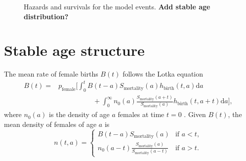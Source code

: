 \documentclass[12pt]{article}
\newcommand{\md}{\mathrm{d}}
\begin{document}
\begin{figure}
  \centering
  
  \caption{Hazards and survivals for the model events.
    \textbf{Add stable age distribution?}}
  \label{fig:distributions}
\end{figure}


\section{Stable age structure}
\label{stable_age_structure}

The mean rate of female births $B(t)$ follows the Lotka equation
\begin{equation}
  \label{lotka}
  \begin{split}
    B(t) =&
    p_{\text{female}} \bigg[
      \int_0^t B(t - a)
      S_{\text{mortality}}(a)
      h_{\text{birth}}(t, a) \md a
    \\
    & \quad\quad\quad\quad\quad {} +
      \int_0^{\infty} n_0(a)
      \frac{S_{\text{mortality}}(a + t)}{S_{\text{mortality}}(a)}
      h_{\text{birth}}(t, a + t) \md a
    \bigg],
  \end{split}
\end{equation}
where $n_0(a)$ is the density of age $a$ females at time $t = 0$
\citetext{\citealp[Chapter VI, Section 29 on
  pp.~159--161]{harris_1963};
  \citealp[Chapter 20 on pp.~353--364]{kot_01}}.
Given $B(t)$, the mean density of females of age $a$ is
\begin{equation}
  n(t, a) =
  \begin{cases}
    B(t - a) S_{\text{mortality}}(a)
    & \text{if $a < t$},
    \\
    n_0(a - t)
    \frac{S_{\text{mortality}}(a)}{S_{\text{mortality}}(a - t)}
    & \text{if $a > t$}.
  \end{cases}
\end{equation}
\end{document}
